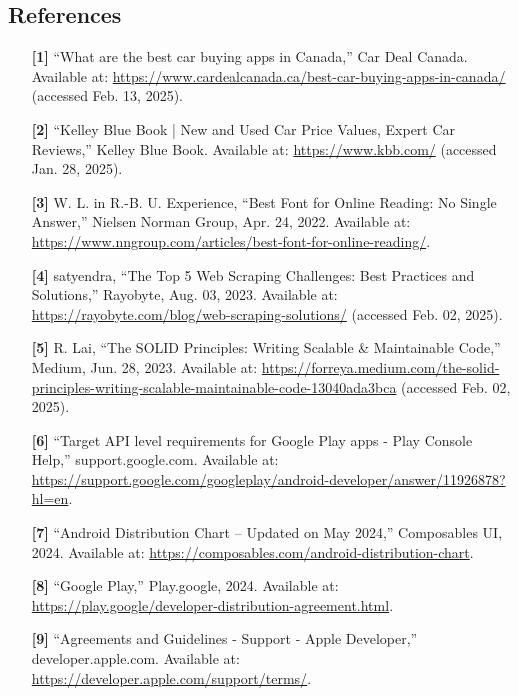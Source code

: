 \documentclass[]{article}
\begin{document}
\subsection{References}
\label{sub:references}
\begin{enumerate}

	\item [\textbf{[1]}] “What are the best car buying apps in Canada,” Car Deal Canada. Available at: \url{https://www.cardealcanada.ca/best-car-buying-apps-in-canada/} (accessed Feb. 13, 2025).

    \item [\textbf{[2]}] “Kelley Blue Book | New and Used Car Price Values, Expert Car Reviews,” Kelley Blue Book. Available at: \url{https://www.kbb.com/} (accessed Jan. 28, 2025).

    \item [\textbf{[3]}] W. L. in R.-B. U. Experience, “Best Font for Online Reading: No Single Answer,” Nielsen Norman Group, Apr. 24, 2022. Available at: \url{https://www.nngroup.com/articles/best-font-for-online-reading/}.
    
    \item [\textbf{[4]}] satyendra, “The Top 5 Web Scraping Challenges: Best Practices and Solutions,” Rayobyte, Aug. 03, 2023. Available at: \url{https://rayobyte.com/blog/web-scraping-solutions/} (accessed Feb. 02, 2025).
    
    \item [\textbf{[5]}] R. Lai, “The SOLID Principles: Writing Scalable \& Maintainable Code,” Medium, Jun. 28, 2023. Available at: \url{https://forreya.medium.com/the-solid-principles-writing-scalable-maintainable-code-13040ada3bca} (accessed Feb. 02, 2025).

    \item [\textbf{[6]}] “Target API level requirements for Google Play apps - Play Console Help,” support.google.com. Available at: \url{https://support.google.com/googleplay/android-developer/answer/11926878?hl=en}.

    \item [\textbf{[7]}] “Android Distribution Chart – Updated on May 2024,” Composables UI, 2024. Available at: \url{https://composables.com/android-distribution-chart}.
    
    \item [\textbf{[8]}] “Google Play,” Play.google, 2024. Available at: \url{https://play.google/developer-distribution-agreement.html}.
    
    \item [\textbf{[9]}] “Agreements and Guidelines - Support - Apple Developer,” developer.apple.com. Available at: \url{https://developer.apple.com/support/terms/}.
    

\end{enumerate}
\end{document}
